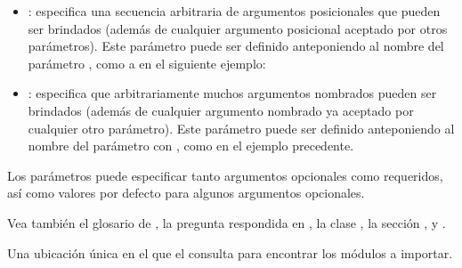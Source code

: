 \documentclass[a4,10pt,spanish]{sphinxmanual}
\begin{document}
\begin{description}
\begin{itemize}
\item {} 
\sphinxAtStartPar
{}: especifica una secuencia arbitraria de argumentos posicionales que pueden ser brindados (además de cualquier argumento posicional aceptado por otros parámetros).  Este parámetro puede ser definido anteponiendo al nombre del parámetro \sphinxcode{\sphinxupquote{*}}, como a  en el siguiente ejemplo:

\begin{sphinxVerbatim}[commandchars=\\\{\}]
   
\end{sphinxVerbatim}

\item {} 
\sphinxAtStartPar
{}: especifica que arbitrariamente muchos argumentos nombrados pueden ser brindados (además de cualquier argumento nombrado ya aceptado por cualquier otro parámetro).  Este parámetro puede ser definido anteponiendo al nombre del parámetro con \sphinxcode{\sphinxupquote{**}}, como  en el ejemplo precedente.

\end{itemize}

\sphinxAtStartPar
Los parámetros puede especificar tanto argumentos opcionales como requeridos, así como valores por defecto para algunos argumentos opcionales.

\sphinxAtStartPar
Vea también el glosario de {\hyperref[\detokenize{glossary:term-argument}]{}}, la pregunta respondida en , la clase , la sección  , y .

\item[{entrada de ruta\index{entrada de ruta@\spxentry{entrada de ruta}|spxpagem}\phantomsection\label{\detokenize{glossary:term-path-entry}}}] \leavevmode
\sphinxAtStartPar
Una ubicación única en el {\hyperref[\detokenize{glossary:term-import-path}]{}} que el {\hyperref[\detokenize{glossary:term-path-based-finder}]{}} consulta para encontrar los módulos a importar.


\end{description}
\end{document}
